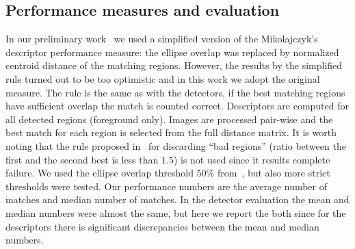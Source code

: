 \documentclass[review]{elsarticle}
\begin{document}
\subsection{Performance measures and evaluation\label{sec:descrperformance}}
In our preliminary work~\cite{LanKanKam:2012} we used a simplified
version of the Mikolajczyk's descriptor performance measure: the ellipse
overlap was replaced by normalized centroid distance of the matching
regions. However, the results by the simplified rule turned out to be
too optimistic and in this work we adopt the original measure. The
rule is the same as with the detectors, if the best matching regions
have sufficient overlap the match is counted correct.
Descriptors are computed for
all detected regions (foreground only). Images are processed
pair-wise and the best match for each region is selected from
the full distance matrix.
It is worth noting
that the rule proposed in~\cite{Low:2004} for discarding ``bad regions''
(ratio between the first and the second best is less than $1.5$) is
not used since it results complete failure.
We used the ellipse
overlap threshold $50\%$ from~\cite{MikSch:2005}, but also more strict
thresholds were tested.
Our performance numbers are the average number of matches and median
number of matches. In the detector evaluation the mean and median
numbers were almost the same, but here we report the both since
for the descriptors there is significant discrepancies between the mean
and median numbers.
%

%
\end{document}
